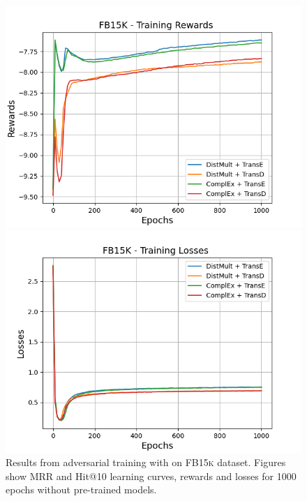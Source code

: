 \begin{figure}
    \begin{minipage}{.5\textwidth}
      \centering
      \includegraphics[width=\linewidth]{figures/results/gan_train/not_pretrained/random/fb15k/1k_epochs/random_fb15k_rew.png}
    \end{minipage}%
     \begin{minipage}{.5\textwidth}
      \centering
      \includegraphics[width=\linewidth]{figures/results/gan_train/not_pretrained/random/fb15k/1k_epochs/random_fb15k_losses.png}
    \end{minipage}%
    \caption{Results from adversarial training with \origsampling on \textsc{FB15k} dataset.
    Figures show MRR and Hit@10 learning curves, rewards and losses for 1000 epochs without pre-trained models.}
    \label{fig:gan_train_not_pretrained_random_fb15k}
\end{figure}
